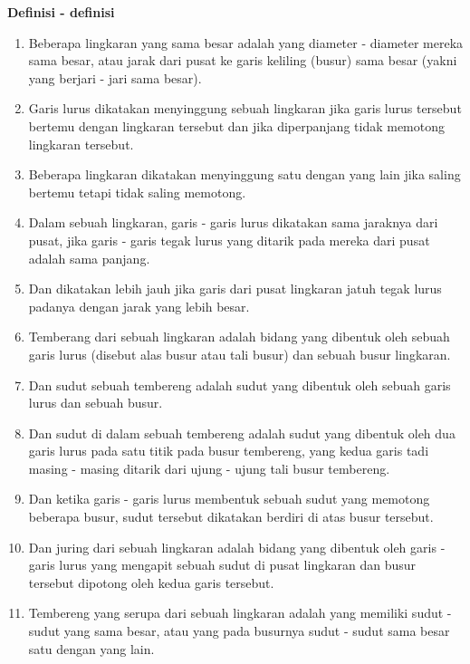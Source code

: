 \documentclass[a4paper]{book}
\begin{document}
\begin{center}
\textbf{Definisi - definisi}
\end{center} 
\begin{enumerate}
\item Beberapa lingkaran yang sama besar adalah yang diameter - diameter mereka
sama besar, atau jarak dari pusat ke garis keliling (busur) sama besar 
(yakni yang berjari - jari sama besar).
\item Garis lurus dikatakan menyinggung sebuah lingkaran jika garis lurus 
tersebut bertemu dengan lingkaran tersebut dan jika diperpanjang tidak 
memotong lingkaran tersebut.
\item Beberapa lingkaran dikatakan menyinggung  satu dengan yang lain jika
saling bertemu tetapi tidak saling memotong.
\item Dalam sebuah lingkaran, garis - garis lurus dikatakan sama jaraknya 
dari pusat, jika garis - garis tegak lurus yang ditarik pada mereka dari
pusat adalah sama panjang.
\item Dan dikatakan lebih jauh jika garis dari pusat lingkaran jatuh tegak
lurus padanya dengan jarak yang lebih besar.
\item Temberang dari sebuah lingkaran adalah bidang yang dibentuk oleh
sebuah garis lurus (disebut alas busur atau tali busur) dan sebuah busur 
lingkaran.
\item Dan sudut sebuah tembereng adalah sudut yang dibentuk oleh 
sebuah garis lurus dan sebuah busur.
\item Dan sudut di dalam sebuah tembereng adalah sudut yang dibentuk oleh
dua garis lurus pada satu titik pada busur tembereng, yang kedua garis tadi
masing - masing ditarik dari ujung - ujung tali busur tembereng.
\item Dan ketika garis - garis lurus membentuk sebuah sudut yang memotong 
beberapa busur, sudut tersebut dikatakan berdiri di atas busur tersebut.
\item Dan juring dari sebuah lingkaran adalah bidang yang dibentuk oleh
garis - garis lurus yang mengapit sebuah sudut di pusat lingkaran  dan busur 
tersebut dipotong oleh kedua garis tersebut.
\item Tembereng yang serupa dari sebuah lingkaran adalah yang memiliki sudut - 
sudut yang sama besar, atau yang pada busurnya sudut - sudut sama besar satu 
dengan yang lain.
\end{enumerate}

\end{document}
